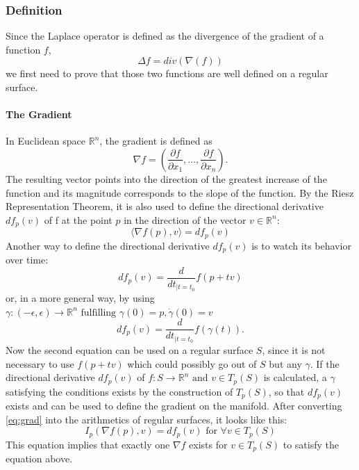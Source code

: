 \subsubsection{Definition}
Since the Laplace operator is defined as the divergence of the gradient of a function $f$,
$$\Delta f = div(\nabla(f))$$
we first need to prove that those two functions are well defined on a regular surface.

\paragraph{The Gradient}
In Euclidean space $\mathbb{R}^n$, the gradient is defined as
$$\nabla f = \left(\frac{\partial f}{\partial x_{1}}, \dots, \frac{\partial f}{\partial x_{n}}\right).$$
The resulting vector points into the direction of the greatest increase of the function and its magnitude corresponds to the slope of the function.
By the Riesz Representation Theorem, it is also used to define the directional derivative $d f_{p}(v)$ of f at the point $p$ in the direction of the vector $v \in \mathbb{R}^n$:
\begin{equation}
	\langle \nabla f(p), v \rangle = d f_{p}(v)
	\label{eq:grad}
\end{equation}
Another way to define the directional derivative $d f_p(v)$ is to watch its behavior over time:
\begin{equation*}
	d f_p(v) = \frac{d}{dt_{|t=t_0}} f(p + tv)
\end{equation*}
or, in a more general way, by using $\gamma : (-\epsilon, \epsilon) \rightarrow \mathbb{R}^n \mbox{ fulfilling } \gamma(0) = p, \dot{\gamma}(0) = v$
\begin{equation*}
	d f_p(v) = \frac{d}{dt_{|t=t_0}} f(\gamma(t)).
\end{equation*}
Now the second equation can be used on a regular surface $S$, since it is not necessary to use $f(p+tv)$ which could possibly go out of $S$ but any $\gamma$.
If the directional derivative $df_p(v)$ of $f: S \rightarrow \mathbb{R}^n \mbox{ and } v \in T_p(S)$ is calculated, a $\gamma$ satisfying the conditions exists by the construction of $T_p(S)$, so that $df_p(v)$ exists and can be used to define the gradient on the manifold.
After converting \eqref{eq:grad} into the arithmetics of regular surfaces, it looks like this:
\begin{equation*}
	I_p(\nabla f(p),v) = d f_p(v) \mbox{ for } \forall v \in T_p(S)
\end{equation*}
This equation implies that exactly one $\nabla f$ exists for $v \in T_p(S)$ to satisfy the equation above.

